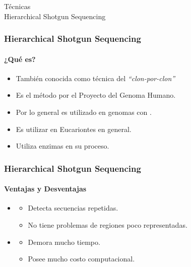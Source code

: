 \frame
{
\begin{center}
	\Huge{Técnicas}\\
	\huge{Hierarchical Shotgun Sequencing}
\end{center}
}

\frame
{
\frametitle{Hierarchical Shotgun Sequencing}
\framesubtitle{¿Qué es?}
\begin{itemize}
	\item También conocida como técnica del \emph{``clon-por-clon''}
	\item Es el método  por el Proyecto del Genoma Humano.
	\item Por lo general es utilizado en genomas con .
	\item Es  utilizar en Eucariontes en general.
	\item Utiliza enzimas en su proceso.
\end{itemize}
}


\frame
{
\frametitle{Hierarchical Shotgun Sequencing}
\framesubtitle{Ventajas y Desventajas}
\begin{itemize}
	\item {}
	\begin{itemize}
		\item Detecta secuencias repetidas.
		\item No tiene problemas de regiones poco representadas.
	\end{itemize}
	\item {}
	\begin{itemize}
		\item Demora mucho tiempo.
		\item Posee mucho costo computacional.
	\end{itemize}
\end{itemize}
}


